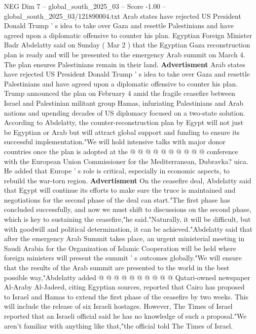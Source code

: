 \begin{textsample}{NEG Dim 7 – global\_south\_2025\_03 – Score -1.00 – global\_south\_2025\_03/121890004.txt}  \label{ex:f7_neg_026}
Arab states have rejected US President Donald Trump ' s idea to take over Gaza and resettle Palestinians and have agreed upon a diplomatic offensive to counter his plan.
Egyptian Foreign Minister Badr Abdelatty said on Sunday ( Mar 2 ) that the Egyptian Gaza reconstruction plan is ready and will be presented to the emergency Arab summit on March 4.
The plan ensures Palestinians remain in their land. \textbf{Advertisment} Arab states have rejected US President Donald Trump ' s idea to take over Gaza and resettle Palestinians and have agreed upon a diplomatic offensive to counter his plan.
Trump announced the plan on February 4 amid the fragile ceasefire between Israel and Palestinian militant group Hamas, infuriating Palestinians and Arab nations and upending decades of US diplomacy focused on a two-state solution.
According to Abdelatty, the counter-reconstruction plan by Egypt will not just be Egyptian or Arab but will attract global support and funding to ensure its successful implementation."We will hold intensive talks with major donor countries once the plan is adopted at the @ @ @ @ @ @ @ @ @ @ conference with the European Union Commissioner for the Mediterranean, Dubravka? uica.
He added that Europe ' s role is critical, especially in economic aspects, to rebuild the war-torn region. \textbf{Advertisment} On the ceasefire deal, Abdelatty said that Egypt will continue its efforts to make sure the truce is maintained and negotiations for the second phase of the deal can start."The first phase has concluded successfully, and now we must shift to discussions on the second phase, which is key to sustaining the ceasefire,"he said."Naturally, it will be difficult, but with goodwill and political determination, it can be achieved."Abdelatty said that after the emergency Arab Summit takes place, an urgent ministerial meeting in Saudi Arabia for the Organization of Islamic Cooperation will be held where foreign ministers will present the summit ' s outcomes globally."We will ensure that the results of the Arab summit are presented to the world in the best possible way,"Abdelatty added @ @ @ @ @ @ @ @ @ @ Qatari-owned newspaper Al-Araby Al-Jadeed, citing Egyptian sources, reported that Cairo has proposed to Israel and Hamas to extend the first phase of the ceasefire by two weeks.
This will include the release of six Israeli hostages.
However, The Times of Israel reported that an Israeli official said he has no knowledge of such a proposal."We aren't familiar with anything like that,"the official told The Times of Israel.

\end{textsample}
